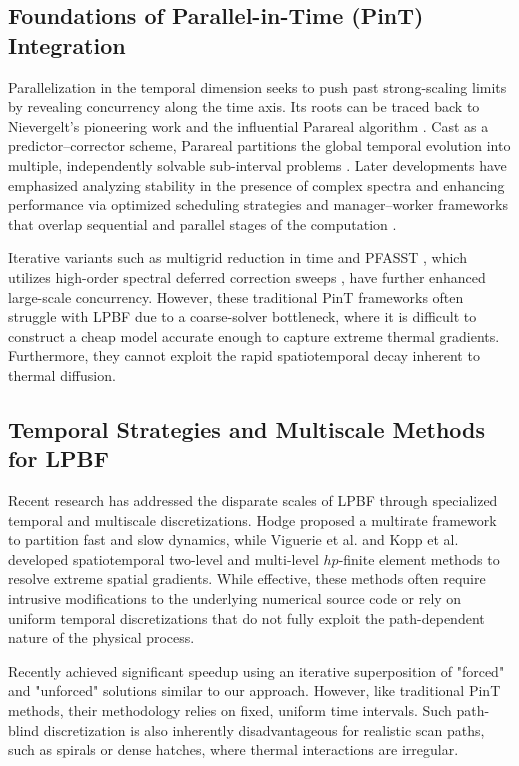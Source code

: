 \documentclass[conference]{IEEEtran}
\begin{document}
\subsection{Foundations of Parallel-in-Time (PinT) Integration}
Parallelization in the temporal dimension seeks to push past strong-scaling limits by revealing concurrency along the time axis. Its roots can be traced back to Nievergelt’s pioneering work \cite{nievergelt1964parallel} and the influential Parareal algorithm \cite{lions2001resolution}. Cast as a predictor–corrector scheme, Parareal partitions the global temporal evolution into multiple, independently solvable sub-interval problems \cite{lions2001resolution}. Later developments have emphasized analyzing stability in the presence of complex spectra \cite{staff2005stability} and enhancing performance via optimized scheduling strategies and manager–worker frameworks that overlap sequential and parallel stages of the computation \cite{aubanel2011scheduling}.

Iterative variants such as multigrid reduction in time  \cite{falgout2017multigrid} and PFASST \cite{emmett2012toward}, which utilizes high-order spectral deferred correction sweeps \cite{dutt2000spectral}, have further enhanced large-scale concurrency. However, these traditional PinT frameworks often struggle with LPBF due to a coarse-solver bottleneck, where it is difficult to construct a cheap model accurate enough to capture extreme thermal gradients. Furthermore, they cannot exploit the rapid spatiotemporal decay inherent to thermal diffusion.

\subsection{Temporal Strategies and Multiscale Methods for LPBF} 
Recent research has addressed the disparate scales of LPBF through specialized temporal and multiscale discretizations. Hodge \cite{hodge2021towards} proposed a multirate framework to partition fast and slow dynamics, while Viguerie et al. \cite{viguerie2022spatiotemporal} and Kopp et al. \cite{kopp2022efficient} developed spatiotemporal two-level and multi-level $hp$-finite element methods to resolve extreme spatial gradients. While effective, these methods often require intrusive modifications to the underlying numerical source code or rely on uniform temporal discretizations that do not fully exploit the path-dependent nature of the physical process.

Recently \cite{coleman2026time} achieved significant speedup using an iterative superposition of "forced" and "unforced" solutions similar to our approach. 
However, like traditional PinT methods, their methodology relies on fixed, uniform time intervals. 
Such path-blind discretization is also inherently disadvantageous for realistic scan paths, such as spirals or dense hatches, where thermal interactions are irregular.
\end{document}
